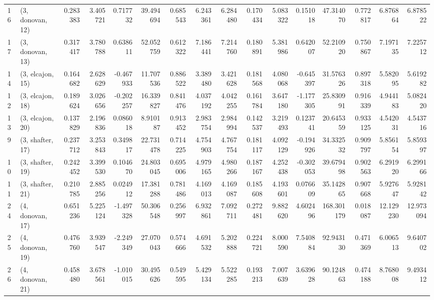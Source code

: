 \begin{tabular}{llrrrrrrrrrrrrrr}
16 &  (3, donovan, 12) &   0.283383 &  3.405721 &  0.717732 &  39.494694 &  0.685543 &   6.243361 &  6.284480 &  0.170434 &  5.083322 &  0.151018 &   47.314070 &  0.772817 &   6.876864 &   6.878522 \\
17 &  (3, donovan, 13) &   0.317417 &  3.780788 &  0.638611 &  52.052759 &  0.612322 &   7.186441 &  7.214760 &  0.180891 &  5.381986 &  0.642007 &   52.210920 &  0.750867 &   7.197135 &   7.225712 \\
14 &  (3, elcajon, 15) &   0.164682 &  2.628629 & -0.467933 &  11.707536 &  0.886522 &   3.389480 &  3.421628 &  0.181568 &  4.080068 & -0.645397 &   31.576326 &  0.897318 &   5.582095 &   5.619282 \\
12 &  (3, elcajon, 18) &   0.189624 &  3.026656 & -0.202257 &  16.339827 &  0.841476 &   4.037192 &  4.042255 &  0.161784 &  3.647180 & -1.177305 &   25.830991 &  0.916339 &   4.944183 &   5.082420 \\
13 &  (3, elcajon, 20) &   0.137829 &  2.196836 &  0.086018 &   8.910187 &  0.913452 &   2.983754 &  2.984994 &  0.142537 &  3.219493 &  0.123741 &   20.645359 &  0.933125 &   4.542031 &   4.543716 \\
9  &  (3, shafter, 17) &   0.237712 &  3.253843 &  0.349817 &  22.731478 &  0.714225 &   4.754903 &  4.767754 &  0.181117 &  4.092129 & -0.194926 &   34.332532 &  0.909797 &   5.856154 &   5.859397 \\
10 &  (3, shafter, 19) &   0.242452 &  3.399530 &  0.104670 &  24.803045 &  0.695006 &   4.979165 &  4.980266 &  0.187167 &  4.252438 & -0.302053 &   39.679498 &  0.902563 &   6.291920 &   6.299166 \\
11 &  (3, shafter, 21) &   0.210785 &  2.885256 &  0.024912 &  17.381288 &  0.781486 &   4.169013 &  4.169087 &  0.185608 &  4.193601 &  0.076609 &   35.142865 &  0.907668 &   5.927647 &   5.928142 \\
24 &  (4, donovan, 17) &   0.651236 &  5.225124 & -1.497328 &  50.306548 &  0.256997 &   6.932861 &  7.092711 &  0.272481 &  9.882620 &  4.602496 &  168.301179 &  0.018087 &  12.129230 &  12.973094 \\
25 &  (4, donovan, 19) &   0.476760 &  3.939547 & -2.249349 &  27.070043 &  0.574666 &   4.691532 &  5.202888 &  0.224721 &  8.000590 &  7.540884 &   92.943130 &  0.471369 &   6.006513 &   9.640702 \\
26 &  (4, donovan, 21) &   0.458480 &  3.678561 & -1.010015 &  30.495626 &  0.549595 &   5.429134 &  5.522285 &  0.193213 &  7.007639 &  3.639628 &   90.124863 &  0.474188 &   8.768008 &   9.493412 \\

\end{tabular}
